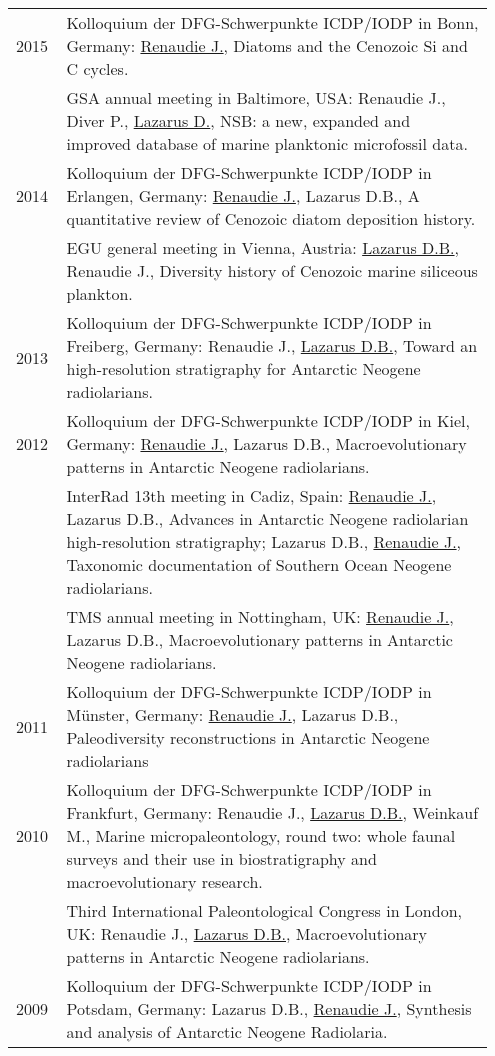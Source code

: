 \documentclass[11pt, a4paper]{article}
\begin{document}
\begin{longtable}{@{}p{0.1\linewidth} P{0.85\linewidth}@{}}
2015 & Kolloquium der DFG-Schwerpunkte ICDP/IODP in Bonn, Germany: \underline{Renaudie J.}, Diatoms and the Cenozoic Si and C cycles.\\
 & GSA annual meeting in Baltimore, USA: Renaudie J., Diver P., \underline{Lazarus D.}, NSB: a new, expanded and improved database of marine planktonic microfossil data.\\
2014 & Kolloquium der DFG-Schwerpunkte ICDP/IODP in Erlangen, Germany: \underline{Renaudie J.}, Lazarus D.B., A quantitative review of Cenozoic diatom deposition history.\\
 & EGU general meeting in Vienna, Austria: \underline{Lazarus D.B.}, Renaudie J., Diversity history of Cenozoic marine siliceous plankton.\\
2013 & Kolloquium der DFG-Schwerpunkte ICDP/IODP in Freiberg, Germany: Renaudie J., \underline{Lazarus D.B.}, Toward an high-resolution stratigraphy for Antarctic Neogene radiolarians.\\
2012 & Kolloquium der DFG-Schwerpunkte ICDP/IODP in Kiel, Germany: \underline{Renaudie J.}, Lazarus D.B., Macroevolutionary patterns in Antarctic Neogene radiolarians.\\
 & InterRad 13th meeting in Cadiz, Spain: \underline{Renaudie J.}, Lazarus D.B., Advances in Antarctic Neogene radiolarian high-resolution stratigraphy; Lazarus D.B., \underline{Renaudie J.}, Taxonomic documentation of Southern Ocean Neogene radiolarians.\\
 & TMS annual meeting in Nottingham, UK: \underline{Renaudie J.}, Lazarus D.B., Macroevolutionary patterns in Antarctic Neogene radiolarians.\\
2011 & Kolloquium der DFG-Schwerpunkte ICDP/IODP in Münster, Germany: \underline{Renaudie J.}, Lazarus D.B., Paleodiversity reconstructions in Antarctic Neogene radiolarians\\
2010 & Kolloquium der DFG-Schwerpunkte ICDP/IODP in Frankfurt, Germany: Renaudie J., \underline{Lazarus D.B.}, Weinkauf M., Marine micropaleontology, round two: whole faunal surveys and their use in biostratigraphy and macroevolutionary research.\\
 & Third International Paleontological Congress in London, UK: Renaudie J., \underline{Lazarus D.B.}, Macroevolutionary patterns in Antarctic Neogene radiolarians.\\
2009 & Kolloquium der DFG-Schwerpunkte ICDP/IODP in Potsdam, Germany: Lazarus D.B., \underline{Renaudie J.}, Synthesis and analysis of Antarctic Neogene Radiolaria.\\

\end{longtable}
\end{document}
